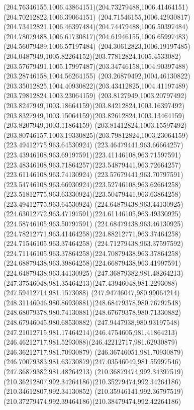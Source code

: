 {    \curveto(204.76346155,1006.43864151)(204.73279488,1006.41464151)(204.70212822,1006.39064151)
    \curveto(204.71546155,1006.42930817)(204.73412821,1006.46397484)(204.74479488,1006.50397484)
    \curveto(204.78079488,1006.61730817)(204.61946155,1006.65997483)(204.56079489,1006.57197484)
    \curveto(204.30612823,1006.19197485)(204.0487949,1005.82264152)(203.77812824,1005.4533082)
    \curveto(203.57679491,1005.17997487)(203.34746158,1004.90397488)(203.28746158,1004.56264155)
    \curveto(203.26879492,1004.46130822)(203.35012825,1004.40930822)(203.43412825,1004.41197489)
    \moveto(203.79812824,1003.23064159)
    \curveto(203.8127949,1003.20797492)(203.8247949,1003.18664159)(203.84212824,1003.16397492)
    \curveto(203.8327949,1003.15064159)(203.82612824,1003.13464159)(203.8207949,1003.11864159)
    \curveto(203.81412824,1003.15597492)(203.80746157,1003.19330825)(203.79812824,1003.23064159)
    \moveto(223.49412775,963.64530924)
    \curveto(223.46479441,963.66664257)(223.43946108,963.69197591)(223.41146108,963.71597591)
    \curveto(223.48346108,963.71864257)(223.54879441,963.72664257)(223.61146108,963.74130924)
    \curveto(223.57679441,963.70797591)(223.54746108,963.66930924)(223.52746108,963.62664258)
    \curveto(223.51812775,963.63330924)(223.50479441,963.63864258)(223.49412775,963.64530924)
    \moveto(224.64879438,963.44130925)
    \curveto(224.63012772,963.47197591)(224.61146105,963.49330925)(224.58746105,963.50797591)
    \curveto(224.68479438,963.46130925)(224.78212771,963.41464258)(224.88212771,963.37464258)
    \lineto(224.71546105,963.37464258)
    \curveto(224.71279438,963.37597592)(224.71146105,963.37864258)(224.70879438,963.37864258)
    \curveto(224.68879438,963.39864258)(224.66879438,963.41997591)(224.64879438,963.44130925)
    \moveto(247.36879382,981.48264213)
    \curveto(247.37546048,981.35464213)(247.43946048,981.2293088)(247.59412714,981.1573088)
    \curveto(247.94746047,980.99064214)(248.31146046,980.86930881)(248.68479378,980.76797548)
    \curveto(248.68079378,980.74130881)(248.67679378,980.71330882)(248.67946045,980.68530882)
    \curveto(247.9447938,980.93197548)(247.21012715,981.17464214)(246.4754605,981.41864213)
    \curveto(246.46212717,981.5293088)(246.42212717,981.62930879)(246.36212717,981.70930879)
    \lineto(246.36746051,981.70930879)
    \curveto(246.70079383,981.63730879)(247.03546049,981.55997546)(247.36879382,981.48264213)
    \moveto(210.36879474,992.34397519)
    \curveto(210.36212807,992.34264186)(210.35279474,992.34264186)(210.34612807,992.34130852)
    \curveto(210.35946141,992.36797519)(210.37279474,992.39464186)(210.38479474,992.42264186)
}
